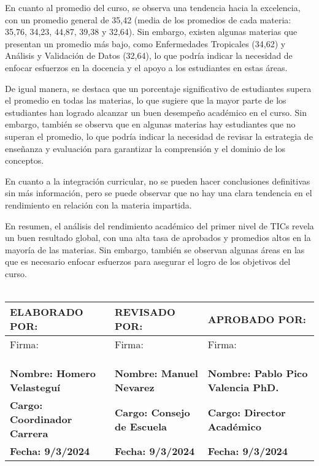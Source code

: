 En cuanto al promedio del curso, se observa una tendencia hacia la excelencia, con un promedio general de 35,42 (media de los promedios de cada materia: 35,76, 34,23, 44,87, 39,38 y 32,64). Sin embargo, existen algunas materias que presentan un promedio más bajo, como Enfermedades Tropicales (34,62) y Análisis y Validación de Datos (32,64), lo que podría indicar la necesidad de enfocar esfuerzos en la docencia y el apoyo a los estudiantes en estas áreas.

De igual manera, se destaca que un porcentaje significativo de estudiantes supera el promedio en todas las materias, lo que sugiere que la mayor parte de los estudiantes han logrado alcanzar un buen desempeño académico en el curso. Sin embargo, también se observa que en algunas materias hay estudiantes que no superan el promedio, lo que podría indicar la necesidad de revisar la estrategia de enseñanza y evaluación para garantizar la comprensión y el dominio de los conceptos.

En cuanto a la integración curricular, no se pueden hacer conclusiones definitivas sin más información, pero se puede observar que no hay una clara tendencia en el rendimiento en relación con la materia impartida.

En resumen, el análisis del rendimiento académico del primer nivel de TICs revela un buen resultado global, con una alta tasa de aprobados y promedios altos en la mayoría de las materias. Sin embargo, también se observan algunas áreas en las que es necesario enfocar esfuerzos para asegurar el logro de los objetivos del curso.\\
\vspace{1cm}\\\begin{tabularx}{\textwidth}{|X|X|X|}
    \hline
    \textbf{ELABORADO POR:} & \textbf{REVISADO POR:} & \textbf{APROBADO POR:} \\ \hline
    Firma: & Firma: & Firma:\\
    &&\\
    &&\\
    &&\\ \hline
    \textbf{Nombre: Homero Velasteguí} & \textbf{Nombre: Manuel Nevarez} & \textbf{Nombre: Pablo Pico Valencia PhD.} \\ \hline
    \textbf{Cargo: Coordinador Carrera} & \textbf{Cargo: Consejo de Escuela} & \textbf{Cargo: Director Académico} \\ \hline
    \textbf{Fecha: 9/3/2024} & \textbf{Fecha: 9/3/2024} & \textbf{Fecha: 9/3/2024} \\ \hline
    \end{tabularx}

